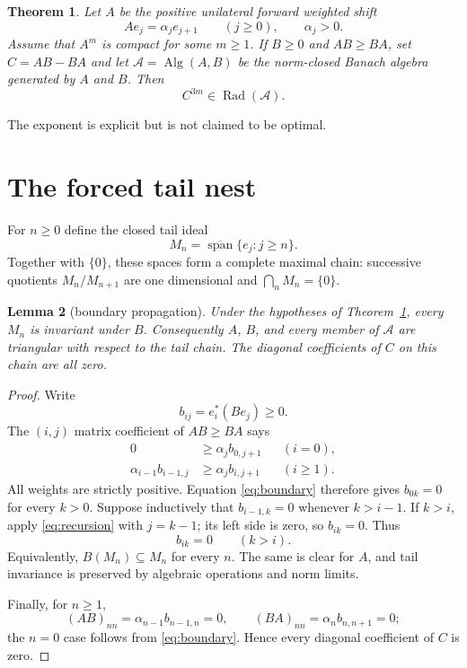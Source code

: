 \documentclass[11pt]{article}
\newtheorem{theorem}{Theorem}
\newtheorem{lemma}[theorem]{Lemma}
\newcommand{\Rad}{\operatorname{Rad}}
\newcommand{\Alg}{\operatorname{Alg}}
\begin{document}
\begin{theorem}\label{thm:main}
Let $A$ be the positive unilateral forward weighted shift
\[
       Ae_j=\alpha_j e_{j+1}\qquad(j\geq0),
       \qquad \alpha_j>0.
\]
Assume that $A^m$ is compact for some $m\geq1$.  If $B\geq0$ and
$AB\geq BA$, set $C=AB-BA$ and let $\mathcal A=\Alg(A,B)$ be the norm-closed
Banach algebra generated by $A$ and $B$.  Then
\[
                 C^{3m}\in\Rad(\mathcal A).
\]
\end{theorem}

The exponent is explicit but is not claimed to be optimal.

\section{The forced tail nest}

For $n\geq0$ define the closed tail ideal
\[
        M_n=\overline{\operatorname{span}}\{e_j:j\geq n\}.
\]
Together with $\{0\}$, these spaces form a complete maximal chain: successive
quotients $M_n/M_{n+1}$ are one dimensional and $\bigcap_nM_n=\{0\}$.

\begin{lemma}[boundary propagation]\label{lem:tail}
Under the hypotheses of Theorem~\ref{thm:main}, every $M_n$ is invariant
under $B$.  Consequently $A$, $B$, and every member of $\mathcal A$ are
triangular with respect to the tail chain.  The diagonal coefficients of
$C$ on this chain are all zero.
\end{lemma}

\begin{proof}
Write
\[
       b_{ij}=e_i^*(Be_j)\geq0.
\]
The $(i,j)$ matrix coefficient of $AB\geq BA$ says
\begin{align}
 0&\geq \alpha_j b_{0,j+1} &&(i=0),\label{eq:boundary}\\
 \alpha_{i-1}b_{i-1,j}&\geq \alpha_jb_{i,j+1} &&(i\geq1).
 \label{eq:recursion}
\end{align}
All weights are strictly positive.  Equation \eqref{eq:boundary} therefore
gives $b_{0k}=0$ for every $k>0$.  Suppose inductively that
$b_{i-1,k}=0$ whenever $k>i-1$.  If $k>i$, apply
\eqref{eq:recursion} with $j=k-1$; its left side is zero, so $b_{ik}=0$.
Thus
\[
                         b_{ik}=0\qquad(k>i).
\]
Equivalently, $B(M_n)\subseteq M_n$ for every $n$.  The same is clear for
$A$, and tail invariance is preserved by algebraic operations and norm
limits.

Finally, for $n\geq1$,
\[
 (AB)_{nn}=\alpha_{n-1}b_{n-1,n}=0,
 \qquad
 (BA)_{nn}=\alpha_nb_{n,n+1}=0;
\]
the $n=0$ case follows from \eqref{eq:boundary}.  Hence every diagonal
coefficient of $C$ is zero.
\end{proof}
\end{document}
